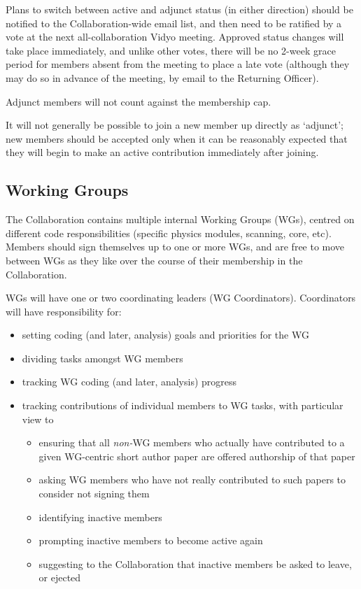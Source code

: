 Plans to switch between active and adjunct status (in either direction) should be notified to the Collaboration-wide email list, and then need to be ratified by a vote at the next all-collaboration Vidyo meeting.  Approved status changes will take place immediately, and unlike other votes, there will be no 2-week grace period for members absent from the meeting to place a late vote (although they may do so in advance of the meeting, by email to the Returning Officer).

Adjunct members will not count against the membership cap.

It will not generally be possible to join a new member up directly as `adjunct'; new members should be accepted only when it can be reasonably expected that they will begin to make an active contribution immediately after joining.

\subsection{Working Groups}

The Collaboration contains multiple internal Working Groups (WGs), centred on different code responsibilities (specific physics modules, scanning, core, etc).  Members should sign themselves up to one or more WGs, and are free to move between WGs as they like over the course of their membership in the Collaboration.

WGs will have one or two coordinating leaders (WG Coordinators).  Coordinators will have responsibility for:
\begin{itemize}
  \item setting coding (and later, analysis) goals and priorities for the WG
  \item dividing tasks amongst WG members
  \item tracking WG coding (and later, analysis) progress
  \item tracking contributions of individual members to WG tasks, with particular view to\begin{itemize}
  \item ensuring that all \textit{non-}WG members who actually have contributed to a given WG-centric short author paper are offered authorship of that paper
  \item asking WG members who have not really contributed to such papers to consider not signing them
  \item identifying inactive members 
  \item prompting inactive members to become active again
  \item suggesting to the Collaboration that inactive members be asked to leave, or ejected 
  \end{itemize}
\end{itemize}

